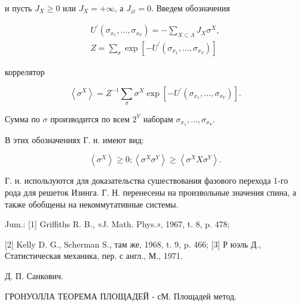\documentclass[10pt]{article}
\begin{document}
и пусть $J_{X} \geqslant 0$ или $J_{X}=+\infty$, а $J_{\varnothing}=0$. Введем обозначения



\[

\begin{gathered}

U^{\prime}\left(\sigma_{x_{1}}, \ldots, \sigma_{x_{V}}\right)=-\sum_{X \subset \Lambda} J_{X} \sigma^{X}, \\

Z=\sum_{\sigma} \exp \left[-U^{\prime}\left(\sigma_{x_{1}}, \ldots, \sigma_{x_{V}}\right)\right]

\end{gathered}

\]



коррелятор



\[

\left\langle\sigma^{X}\right\rangle=Z^{-1} \sum_{\sigma} \sigma^{X} \exp \left[-U^{\prime}\left(\sigma_{x_{1}}, \ldots, \sigma_{x_{V}}\right)\right] .

\]



Сумма по $\sigma$ производится по всем $2^{V}$ наборам $\sigma_{x_{1}}, \ldots, \sigma_{x_{V}}$.

В этих обозначениях Г. н. имеют вид:



\[

\left\langle\sigma^{X}\right\rangle \geqslant 0 ;\left\langle\sigma^{X} \sigma^{Y}\right\rangle \geqslant\left\langle\sigma^{X} X \sigma^{Y}\right\rangle .

\]



Г. н. используются для доказательства сушествования фазового перехода 1-го рода для решеток Изинга. Г. Н. перенесены на произвольные значения спина, а также обобщены на некоммутативные системы.



Jum.: [1] Griffiths R. B., «J. Math. Phys.», 1967, t. 8, p. 478;



[2] Kelly D. G., Scherman S., там же, 1968, t. 9, p. 466; [3] Р юэль Д., Статистическая механика, пер. с англ., М., 1971.



Д. П. Санкович.



ГРОНУОЛЛА ТЕОРЕМА ПЛОЩАДЕЙ - сМ. Площадей метод.
\end{document}
